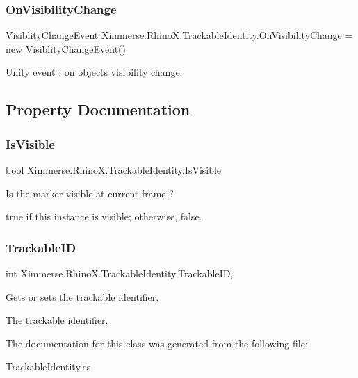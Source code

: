 \subsubsection{\texorpdfstring{On\+Visibility\+Change}{OnVisibilityChange}}
{\footnotesize\ttfamily \mbox{\hyperlink{class_ximmerse_1_1_rhino_x_1_1_visiblity_change_event}{Visiblity\+Change\+Event}} Ximmerse.\+Rhino\+X.\+Trackable\+Identity.\+On\+Visibility\+Change = new \mbox{\hyperlink{class_ximmerse_1_1_rhino_x_1_1_visiblity_change_event}{Visiblity\+Change\+Event}}()}



Unity event \+: on object\textquotesingle{}s visibility change. 



\subsection{Property Documentation}
\mbox{\label{class_ximmerse_1_1_rhino_x_1_1_trackable_identity_a6265ce8a7d68c19fef42587c574a6981}} 
\subsubsection{\texorpdfstring{Is\+Visible}{IsVisible}}
{\footnotesize\ttfamily bool Ximmerse.\+Rhino\+X.\+Trackable\+Identity.\+Is\+Visible\hspace{0.3cm}{\ttfamily [get]}}



Is the marker visible at current frame ? 

{\ttfamily true} if this instance is visible; otherwise, {\ttfamily false}.\mbox{\label{class_ximmerse_1_1_rhino_x_1_1_trackable_identity_a271412a107c63cfd093732698616f331}} 
\subsubsection{\texorpdfstring{Trackable\+ID}{TrackableID}}
{\footnotesize\ttfamily int Ximmerse.\+Rhino\+X.\+Trackable\+Identity.\+Trackable\+ID\hspace{0.3cm}{\ttfamily [get]}, {\ttfamily [set]}}



Gets or sets the trackable identifier. 

The trackable identifier.

The documentation for this class was generated from the following file\+:\begin{DoxyCompactItemize}
\item 
Trackable\+Identity.\+cs\end{DoxyCompactItemize}

